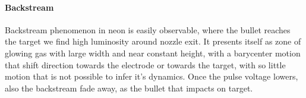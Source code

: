 \paragraph{Backstream}
Backstream phenomenon in neon is easily observable, where the bullet reaches the target we find high luminosity around nozzle exit. It presents itself as zone of glowing gas with large width and near constant height, with a barycenter motion that shift direction towards the electrode or towards the target, with so little motion that is not possible to infer it's dynamics. Once the pulse voltage lowers, also the backstream fade away, as the bullet that impacts on target. 

\begin{figure}
 \centering
 \hfill
 
 \hfill
 

\end{figure}

